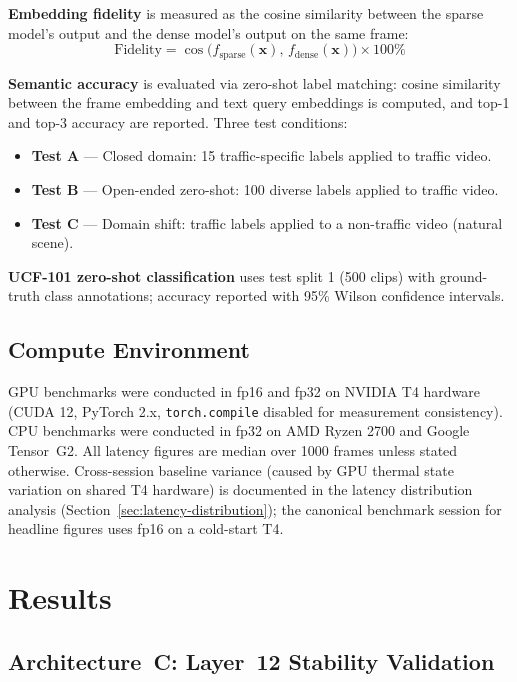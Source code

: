 \documentclass{article}
\begin{document}
\textbf{Embedding fidelity} is measured as the cosine similarity between
the sparse model's output and the dense model's output on the same frame:
\begin{equation}
    \label{eq:fidelity}
    \text{Fidelity} = \cos\!\bigl(f_{\text{sparse}}(\mathbf{x}),\,
                                   f_{\text{dense}}(\mathbf{x})\bigr)
                      \times 100\%
\end{equation}

\textbf{Semantic accuracy} is evaluated via zero-shot label matching:
cosine similarity between the frame embedding and text query embeddings
is computed, and top-1 and top-3 accuracy are reported. Three test
conditions:
\begin{itemize}
  \item \textbf{Test A} --- Closed domain: 15 traffic-specific labels
    applied to traffic video.
  \item \textbf{Test B} --- Open-ended zero-shot: 100 diverse labels
    applied to traffic video.
  \item \textbf{Test C} --- Domain shift: traffic labels applied to a
    non-traffic video (natural scene).
\end{itemize}

\textbf{UCF-101 zero-shot classification} uses test split 1 (500 clips)
with ground-truth class annotations; accuracy reported with 95\% Wilson
confidence intervals.

\subsection{Compute Environment}\label{compute-environment}

GPU benchmarks were conducted in fp16 and fp32 on NVIDIA T4 hardware
(CUDA 12, PyTorch 2.x, \texttt{torch.compile} disabled for measurement
consistency). CPU benchmarks were conducted in fp32 on AMD Ryzen 2700
and Google Tensor~G2. All latency figures are median over 1000 frames
unless stated otherwise. Cross-session baseline variance (caused by GPU
thermal state variation on shared T4 hardware) is documented in the
latency distribution analysis (Section~\ref{sec:latency-distribution});
the canonical benchmark session for headline figures uses fp16 on a
cold-start T4.


\section{Results}\label{results}
\subsection{Architecture~C: Layer~12 Stability Validation}
\label{sec:arch-c-stability}
\end{document}
